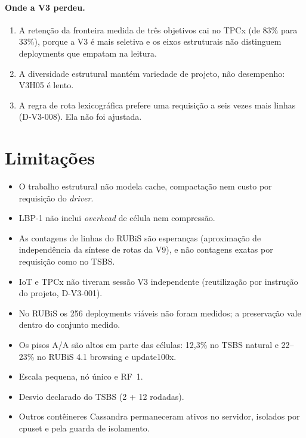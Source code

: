 \documentclass[10pt,a4paper,twoside]{article}
\theoremstyle{definition}\newtheorem{definicao}{Definição}
\begin{document}
\paragraph{Onde a V3 perdeu.}
\begin{enumerate}
\item A retenção da fronteira medida de três objetivos cai no TPCx (de 83\% para 33\%), porque a V3 é mais seletiva e os
eixos estruturais não distinguem deployments que empatam na leitura.
\item A diversidade estrutural mantém variedade de projeto, não desempenho: V3H05 é lento.
\item A regra de rota lexicográfica prefere uma requisição a seis vezes mais linhas (D-V3-008). Ela não foi ajustada.
\end{enumerate}

\section{Limitações}
\label{sec:limites}
\begin{itemize}
\item O trabalho estrutural não modela cache, compactação nem custo por requisição do \emph{driver}.
\item LBP-1 não inclui \emph{overhead} de célula nem compressão.
\item As contagens de linhas do RUBiS são esperanças (aproximação de independência da síntese de rotas da V9), e não
contagens exatas por requisição como no TSBS.
\item IoT e TPCx não tiveram sessão V3 independente (reutilização por instrução do projeto, D-V3-001).
\item No RUBiS os 256 deployments viáveis não foram medidos; a preservação vale dentro do conjunto medido.
\item Os pisos A/A são altos em parte das células: 12,3\% no TSBS natural e 22--23\% no RUBiS 4.1 browsing e update100x.
\item Escala pequena, nó único e RF~1.
\item Desvio declarado do TSBS (2 + 12 rodadas).
\item Outros contêineres Cassandra permaneceram ativos no servidor, isolados por cpuset e pela guarda de isolamento.
\end{itemize}

\end{document}
